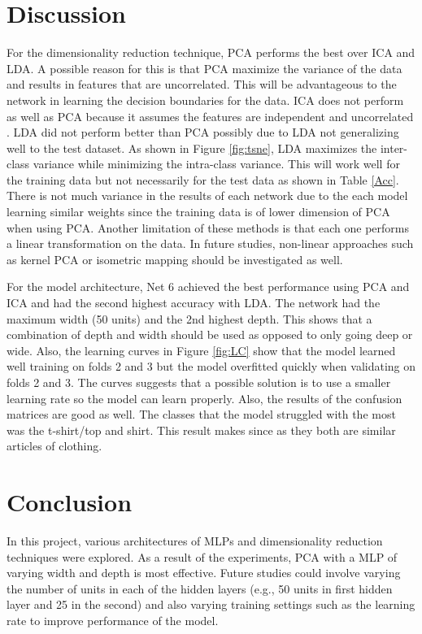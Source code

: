 \documentclass[conference]{IEEEtran}
\begin{document}
\section{Discussion}
	For the dimensionality reduction technique, PCA performs the best over ICA and LDA. A possible reason for this is that PCA maximize the variance of the data and results in features that are uncorrelated. This will be advantageous to the network in learning the decision boundaries for the data. ICA does not perform as well as PCA because it assumes the features are independent and uncorrelated \cite{de2000introduction}. LDA did not perform better than PCA possibly due to LDA not generalizing well to the test dataset. As shown in Figure \ref{fig:tsne}, LDA maximizes the inter-class variance while minimizing the intra-class variance. This will work well for the training data but not necessarily for the test data as shown in Table \ref{Acc}. There is not much variance in the results of each network due to the each model learning similar weights since the training data is of lower dimension of PCA when using PCA. Another limitation of these methods is that each one performs a linear transformation on the data. In future studies, non-linear approaches such as kernel PCA or isometric mapping should be investigated as well. 
	
	For the model architecture, Net 6 achieved the best performance using PCA and ICA and had the second highest accuracy with LDA. The network had the maximum width (50 units) and the 2nd highest depth. This shows that a combination of depth and width should be used as opposed to only going deep or wide. Also, the learning curves in Figure \ref{fig:LC} show that the model learned well training on folds 2 and 3 but the model overfitted quickly when validating on folds 2 and 3. The curves suggests that a possible solution is to use a smaller learning rate so the model can learn properly. Also, the results of the confusion matrices are good as well. The classes that the model struggled with the most was the t-shirt/top and shirt. This result makes since as they both are similar articles of clothing. 

\section{Conclusion}
	In this project, various architectures of MLPs and dimensionality reduction techniques were explored. As a result of the experiments, PCA with a MLP of varying width and depth is most effective. Future studies could involve varying the number of units in each of the hidden layers (e.g., 50 units in first hidden layer and 25 in the second) and also varying training settings such as the learning rate to improve performance of the model.


\end{document}

